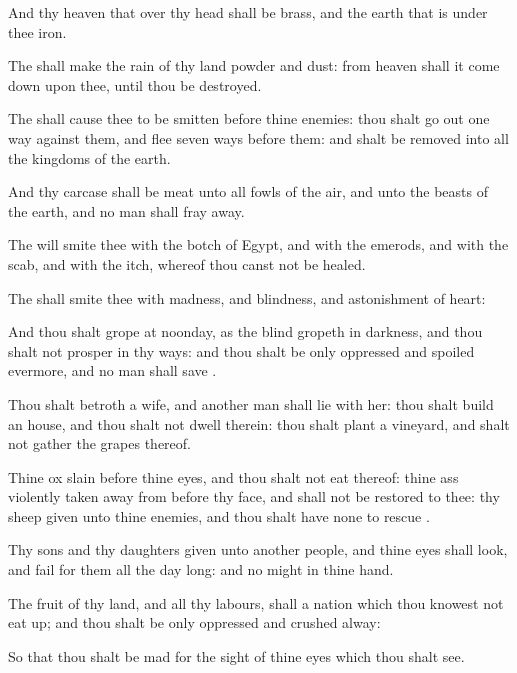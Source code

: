 {And thy
heaven that
{} over thy
head shall be
brass, and the
earth that is under thee
{}
iron.

The
{} shall
make the
rain of thy
land
powder and
dust: from
heaven shall it come
down upon thee, until thou be
destroyed.

The
{} shall
cause thee to be
smitten
before thine
enemies: thou shalt go
out
one
way against them, and
flee
seven
ways
before them: and shalt be
removed into all the
kingdoms of the
earth.

And thy
carcase shall be
meat unto all
fowls of the
air, and unto the
beasts of the
earth, and no man shall fray
{}
away.

The
{} will
smite thee with the
botch of
Egypt, and with the
emerods, and with the
scab, and with the
itch, whereof thou
canst not be
healed.

The
{} shall
smite thee with
madness, and
blindness, and
astonishment of
heart:

And thou shalt
grope at
noonday, as the
blind
gropeth in
darkness, and thou shalt not
prosper in thy
ways: and thou shalt be only
oppressed and
spoiled
evermore, and no man shall
save
{}.

Thou shalt
betroth a
wife, and
another
man shall
lie with her: thou shalt
build an
house, and thou shalt not
dwell therein: thou shalt
plant a
vineyard, and shalt not gather the
grapes thereof.

Thine
ox
{}
slain before thine
eyes, and thou shalt not
eat thereof: thine
ass
{} violently taken
away from before thy
face, and shall not be
restored to thee: thy
sheep
{}
given unto thine
enemies, and thou shalt have none to
rescue
{}.

Thy
sons and thy
daughters
{}
given unto
another
people, and thine
eyes shall
look, and
fail
{} for them all the
day long: and
{} no
might in thine
hand.

The
fruit of thy
land, and all thy
labours, shall a
nation which thou
knowest not eat
up; and thou shalt be only
oppressed and
crushed
alway:

So that thou shalt be
mad for the
sight of thine
eyes which thou shalt
see.

}
